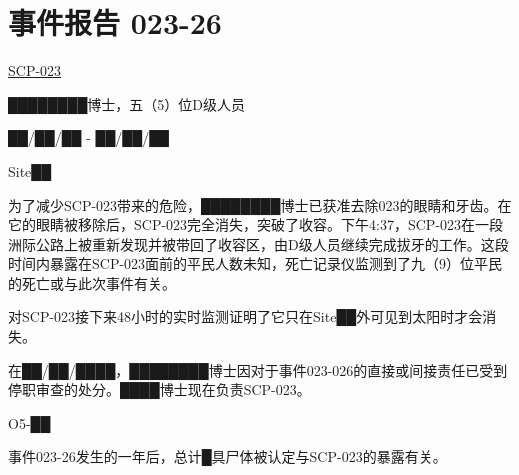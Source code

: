 \chapter{
    事件报告 023-26
}

\label{chap:DOC-incident-report-023-26}

\hyperref[chap:SCP-023]{SCP-023}

████████博士，五（5）位D级人员

██\slash ██\slash ██ - ██\slash ██\slash ██

Site██


为了减少SCP-023带来的危险，████████博士已获准去除023的眼睛和牙齿。在它的眼睛被移除后，SCP-023完全消失，突破了收容。下午4:37，SCP-023在一段洲际公路上被重新发现并被带回了收容区，由D级人员继续完成拔牙的工作。这段时间内暴露在SCP-023面前的平民人数未知，死亡记录仪监测到了九（9）位平民的死亡或与此次事件有关。

对SCP-023接下来48小时的实时监测证明了它只在Site██外可见到太阳时才会消失。


在██\slash ██\slash ████，████████博士因对于事件023-026的直接或间接责任已受到停职审查的处分。████博士现在负责SCP-023。


O5-██

事件023-26发生的一年后，总计█具尸体被认定与SCP-023的暴露有关。
